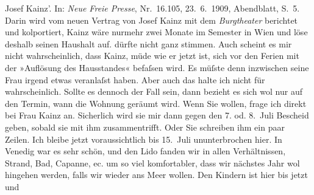 \begin{ledgroupsized}[t]{13cm}
{{{{                        Josef Kainz’}. In: \emph{Neue Freie
                        Presse}, Nr. 16.105, 23. 6. 1909,
                        Abendblatt, S. 5. Darin wird vom neuen Vertrag von Josef Kainz mit
                     dem \emph{Burgtheater} berichtet und kolportiert, Kainz wäre
                  nurmehr zwei Monate im Semester in Wien und löse deshalb seinen Haushalt auf.}}}\label{K_L03501-1h} dürfte nicht ganz stimmen. Auch scheint es
               mir nicht wahrscheinlich, dass Kainz, müde wie
               er jetzt ist, sich vor den Ferien mit der »Auflösung des Hausstandes« befaſsen wird.
               Es müſste denn inzwischen seine Frau irgend etwas veranlaſst haben. Aber auch das halte ich nicht für
               wahrscheinlich. Sollte es dennoch der Fall sein, dann bezieht es sich wol nur auf den
               Termin, wann die Wohnung geräumt wird. Wenn Sie wollen, frage ich direkt bei Frau Kainz an. Sicherlich wird sie mir dann gegen den
               7. od. 8. Juli Bescheid geben, sobald sie mit ihm zusammentrifft. Oder Sie schreiben
               ihm ein paar Zeilen. Ich bleibe jetzt voraussichtlich bis 15. Juli ununterbrochen
               hier. In Venedig war es sehr schön, und den Lido fanden wir in allen Verhältnissen, Strand,
               Bad, Capanne, ec. um so viel komfortabler, dass wir nächstes Jahr wol hingehen
               werden, falls wir wieder ans Meer wollen. Den Kindern ist hier bis jetzt und

\end{ledgroupsized}
